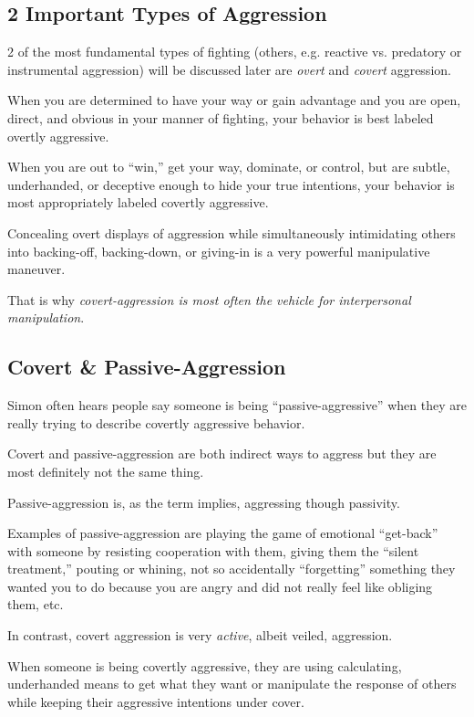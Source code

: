 \documentclass[oneside]{book}
\numberwithin{equation}{section}
\begin{document}
\subsection*{2 Important Types of Aggression}
2 of the most fundamental types of fighting (others, e.g. reactive vs. predatory or instrumental aggression) will be discussed later are \textit{overt} and \textit{covert} aggression.

When you are determined to have your way or gain advantage and you are open, direct, and obvious in your manner of fighting, your behavior is best labeled overtly aggressive.

When you are out to ``win,'' get your way, dominate, or control, but are subtle, underhanded, or deceptive enough to hide your true intentions, your behavior is most appropriately labeled covertly aggressive.

Concealing overt displays of aggression while simultaneously intimidating others into backing-off, backing-down, or giving-in is a very powerful manipulative maneuver.

That is why \textit{covert-aggression is most often the vehicle for interpersonal manipulation}.

\subsection*{Covert \& Passive-Aggression}
Simon often hears people say someone is being ``passive-aggressive'' when they are really trying to describe covertly aggressive behavior.

Covert and passive-aggression are both indirect ways to aggress but they are most definitely not the same thing.

Passive-aggression is, as the term implies, aggressing though passivity.

Examples of passive-aggression are playing the game of emotional ``get-back'' with someone by resisting cooperation with them, giving them the ``silent treatment,'' pouting or whining, not so accidentally ``forgetting'' something they wanted you to do because you are angry and did not really feel like obliging them, etc.

In contrast, covert aggression is very \textit{active}, albeit veiled, aggression.

When someone is being covertly aggressive, they are using calculating, underhanded means to get what they want or manipulate the response of others while keeping their aggressive intentions under cover.
\end{document}
